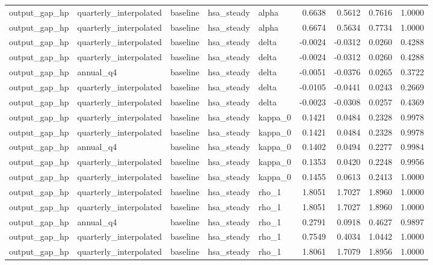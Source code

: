\begin{tabular}{lllllrrrr}
output\_gap\_hp & quarterly\_interpolated & baseline & hsa\_steady & alpha & 0.6638 & 0.5612 & 0.7616 & 1.0000 \\
output\_gap\_hp & quarterly\_interpolated & baseline & hsa\_steady & alpha & 0.6674 & 0.5634 & 0.7734 & 1.0000 \\
output\_gap\_hp & quarterly\_interpolated & baseline & hsa\_steady & delta & -0.0024 & -0.0312 & 0.0260 & 0.4288 \\
output\_gap\_hp & quarterly\_interpolated & baseline & hsa\_steady & delta & -0.0024 & -0.0312 & 0.0260 & 0.4288 \\
output\_gap\_hp & annual\_q4 & baseline & hsa\_steady & delta & -0.0051 & -0.0376 & 0.0265 & 0.3722 \\
output\_gap\_hp & quarterly\_interpolated & baseline & hsa\_steady & delta & -0.0105 & -0.0441 & 0.0243 & 0.2669 \\
output\_gap\_hp & quarterly\_interpolated & baseline & hsa\_steady & delta & -0.0023 & -0.0308 & 0.0257 & 0.4369 \\
output\_gap\_hp & quarterly\_interpolated & baseline & hsa\_steady & kappa\_0 & 0.1421 & 0.0484 & 0.2328 & 0.9978 \\
output\_gap\_hp & quarterly\_interpolated & baseline & hsa\_steady & kappa\_0 & 0.1421 & 0.0484 & 0.2328 & 0.9978 \\
output\_gap\_hp & annual\_q4 & baseline & hsa\_steady & kappa\_0 & 0.1402 & 0.0494 & 0.2277 & 0.9984 \\
output\_gap\_hp & quarterly\_interpolated & baseline & hsa\_steady & kappa\_0 & 0.1353 & 0.0420 & 0.2248 & 0.9956 \\
output\_gap\_hp & quarterly\_interpolated & baseline & hsa\_steady & kappa\_0 & 0.1455 & 0.0613 & 0.2413 & 1.0000 \\
output\_gap\_hp & quarterly\_interpolated & baseline & hsa\_steady & rho\_1 & 1.8051 & 1.7027 & 1.8960 & 1.0000 \\
output\_gap\_hp & quarterly\_interpolated & baseline & hsa\_steady & rho\_1 & 1.8051 & 1.7027 & 1.8960 & 1.0000 \\
output\_gap\_hp & annual\_q4 & baseline & hsa\_steady & rho\_1 & 0.2791 & 0.0918 & 0.4627 & 0.9897 \\
output\_gap\_hp & quarterly\_interpolated & baseline & hsa\_steady & rho\_1 & 0.7549 & 0.4034 & 1.0442 & 1.0000 \\
output\_gap\_hp & quarterly\_interpolated & baseline & hsa\_steady & rho\_1 & 1.8061 & 1.7079 & 1.8956 & 1.0000 \\

\end{tabular}
